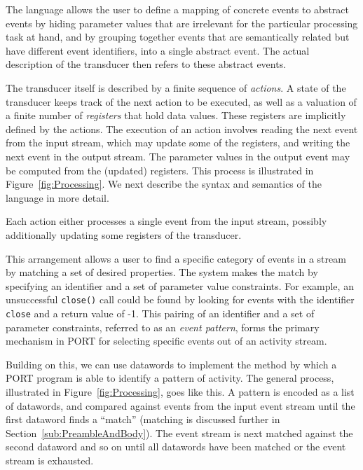 The language allows the user to define a mapping of concrete events to abstract events by hiding parameter values that are irrelevant for the particular processing task at hand, and by grouping together events that are semantically related but have different event identifiers, into a single abstract event.
The actual description of the transducer then refers to these abstract events.

The transducer itself is described by a finite sequence of \emph{actions}. A state of the transducer keeps track of the next action to be executed, as well as a valuation of a finite number of \emph{registers} that hold data values.
These registers are implicitly defined by the actions.
The execution of an action involves reading the next event from the input stream, which may update some of the registers, and writing the next event in the output stream.
The parameter values in the output event may be computed from the (updated) registers. This process is illustrated in Figure~\ref{fig:Processing}.
We next describe the syntax and semantics of the language in more detail.

\iffalse
Each action either processes a single event from the input stream, possibly additionally updating some registers of the transducer.

This arrangement allows a user to find
a specific category of events
in a stream
by matching a set of desired properties.
The system makes the match by specifying
an identifier and a set of parameter value
constraints.  For example, an unsuccessful {\tt close()} call could be
found by looking for events with the identifier {\tt close} and a return
value of -1.  This pairing of an identifier and a set of parameter
constraints, referred to as an \emph{event pattern}, forms the primary mechanism in PORT for
selecting specific events out of an activity stream.

Building on this, we can use datawords to implement the method by which
a PORT program is able to
identify a  pattern of activity.
The general process, illustrated in Figure~\ref{fig:Processing}, goes like
this.  A pattern is encoded as a list of datawords, and compared against
events from the
input event stream until the first dataword
finds a ``match'' (matching is discussed further in
Section~\ref{sub:PreambleAndBody}).  The event stream is next matched
against the
second dataword
and so on until all datawords have been matched or the event stream is
exhausted.


%
%


